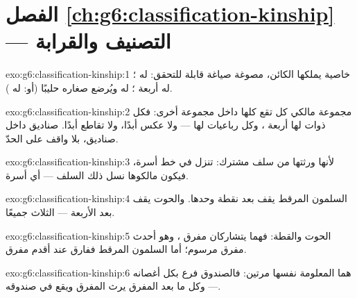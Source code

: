\section*{الفصل \ref{ch:g6:classification-kinship} --- التصنيف والقرابة}

\begin{solution}{exo:g6:classification-kinship:1}
خاصية يملكها الكائن، مصوغة صياغة قابلة للتحقق: له ؛ له
أربعة ؛ له  ويُرضع صغاره حليبًا (أو: له ).
\end{solution}

\begin{solution}{exo:g6:classification-kinship:2}
مجموعة مالكي كل  تقع كلها داخل مجموعة أخرى: فكل ذوات  لها
أربعة ، وكل رباعيات  لها  --- ولا عكس أبدًا،
ولا تقاطع أبدًا. صناديق داخل صناديق، بلا واقف على الحدّ.
\end{solution}

\begin{solution}{exo:g6:classification-kinship:3}
لأنها ورثتها من سلف مشترك:  تنزل في خط أسرة، فيكون مالكوها
نسل ذلك السلف --- أي أسرة.
\end{solution}

\begin{solution}{exo:g6:classification-kinship:4}
السلمون المرقط يقف بعد نقطة  وحدها. والحوت يقف بعد
  الأربعة   --- الثلاث جميعًا.
\end{solution}

\begin{solution}{exo:g6:classification-kinship:5}
الحوت والقطة: فهما يتشاركان مفرق  ، وهو أحدث مفرق
مرسوم؛ أما السلمون المرقط ففارق عند أقدم مفرق.
\end{solution}

\begin{solution}{exo:g6:classification-kinship:6}
هما المعلومة نفسها مرتين: فالصندوق فرع بكل أغصانه --- وكل ما بعد
المفرق يرث  المفرق ويقع في صندوقه.
\end{solution}


